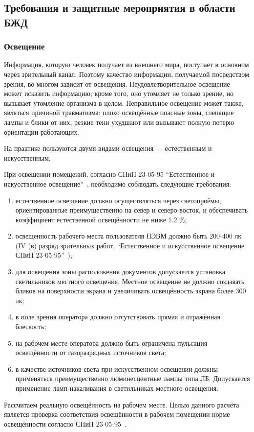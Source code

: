 \subsection{Требования и защитные мероприятия в области БЖД}
\subsubsection{Освещение}

Информация, которую человек получает из внешнего мира, поступает в основном через зрительный канал. Поэтому качество информации, получаемой посредством зрения, во многом зависит от освещения. 
Неудовлетворительное освещение может исказить информацию; кроме того, оно утомляет не только зрение, но вызывает утомление организма в целом. Неправильное освещение может также, являться причиной травматизма: плохо освещённые опасные зоны, слепящие лампы и блики от них, резкие тени ухудшают или вызывают полную потерю ориентации работающих.

На практике пользуются двумя видами освещения — естественным и искусственным.

При освещении помещений, согласно СНиП 23-05-95 ``Естественное и искусственное освещение''~\cite{OT6}, необходимо соблюдать следующие требования:

\begin{enumerate}
\item естественное освещение должно осуществляться через светопроёмы, ориентированные преимущественно на север и северо-восток, и обеспечивать коэффициент естественной освещённости не ниже 1.2 \%;
\item освещенность рабочего места пользователя ПЭВМ должно быть 200-400 лк (IV (в) разряд зрительных работ, ``Естественное и искусственное освещение СНиП 23-05-95''~\cite{OT6});
\item для освещения зоны расположения документов допускается установка светильников местного освещения. Местное освещение не должно создавать бликов на поверхности экрана и увеличивать освещённость экрана более 300 лк;
\item в поле зрения оператора должно отсутствовать прямая и отражённая блескость;
\item на рабочем месте оператора должно быть ограничена пульсация освещённости от газоразрядных источников света;
\item в качестве источников света при искусственном освещении должны применяться преимущественно люминесцентные лампы типа ЛБ. Допускается применение ламп накаливания в светильниках местного освещения.
\end{enumerate}
Рассчитаем реальную освещённость на рабочем месте. Целью данного расчёта является проверка соответствия освещённости в рабочем помещении норме освещённости согласно СНиП 23-05-95~\cite{OT6}.

